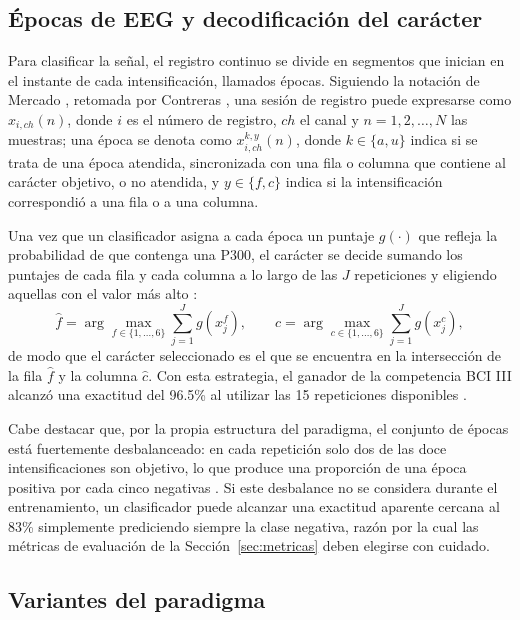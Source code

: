 \subsection{Épocas de EEG y decodificación del carácter}

Para clasificar la señal, el registro continuo se divide en segmentos que inician en el instante
de cada intensificación, llamados épocas. Siguiendo la notación de Mercado \cite{mercado2016},
retomada por Contreras \cite{contreras2021}, una sesión de registro puede expresarse como
$x_{i,ch}(n)$, donde $i$ es el número de registro, $ch$ el canal y $n=1,2,\dots,N$ las muestras;
una época se denota como $x^{k,y}_{i,ch}(n)$, donde $k\in\{a,u\}$ indica si se trata de una época
atendida, sincronizada con una fila o columna que contiene al carácter objetivo, o no atendida, y
$y\in\{f,c\}$ indica si la intensificación correspondió a una fila o a una columna.

Una vez que un clasificador asigna a cada época un puntaje $g(\cdot)$ que refleja la probabilidad
de que contenga una P300, el carácter se decide sumando los puntajes de cada fila y cada columna a
lo largo de las $J$ repeticiones y eligiendo aquellas con el valor más alto \cite{rakotomamonjy2008}:
\begin{equation}
\hat{f} = \arg\max_{f\in\{1,\dots,6\}} \sum_{j=1}^{J} g\!\left(x^{f}_{j}\right), \qquad
\hat{c} = \arg\max_{c\in\{1,\dots,6\}} \sum_{j=1}^{J} g\!\left(x^{c}_{j}\right),
\label{eq:decodificacion}
\end{equation}
de modo que el carácter seleccionado es el que se encuentra en la intersección de la fila
$\hat{f}$ y la columna $\hat{c}$. Con esta estrategia, el ganador de la competencia BCI III
alcanzó una exactitud del 96.5\% al utilizar las 15 repeticiones disponibles
\cite{rakotomamonjy2008}.

Cabe destacar que, por la propia estructura del paradigma, el conjunto de épocas está fuertemente
desbalanceado: en cada repetición solo dos de las doce intensificaciones son objetivo, lo que
produce una proporción de una época positiva por cada cinco negativas \cite{cecotti2011}. Si este
desbalance no se considera durante el entrenamiento, un clasificador puede alcanzar una exactitud
aparente cercana al 83\% simplemente prediciendo siempre la clase negativa, razón por la cual las
métricas de evaluación de la Sección~\ref{sec:metricas} deben elegirse con cuidado.

\subsection{Variantes del paradigma}

